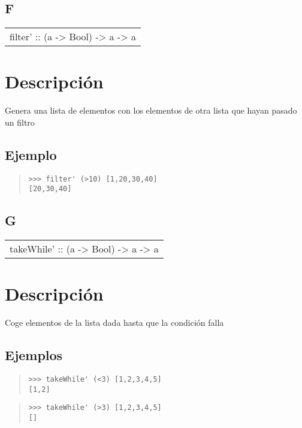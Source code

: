 \subsection{F}
\begin{haddockdesc}
\item[\begin{tabular}{@{}l}
filter' :: (a -> Bool) -> {\char 91}a{\char 93} -> {\char 91}a{\char 93}
\end{tabular}]
{\haddockbegindoc
\section*{Descripción}
Genera una lista de elementos con los elementos de otra lista que hayan pasado un filtro\par
\subsection*{Ejemplo}
\begin{quote}
{\haddockverb\begin{verbatim}
>>> filter' (>10) [1,20,30,40]
[20,30,40]

\end{verbatim}}
\end{quote}}
\end{haddockdesc}
\subsection{G}
\begin{haddockdesc}
\item[\begin{tabular}{@{}l}
takeWhile' :: (a -> Bool) -> {\char 91}a{\char 93} -> {\char 91}a{\char 93}
\end{tabular}]
{\haddockbegindoc
\section*{Descripción}
Coge elementos de la lista dada hasta que la condición falla\par
\subsection*{Ejemplos}
\begin{quote}
{\haddockverb\begin{verbatim}
>>> takeWhile' (<3) [1,2,3,4,5]
[1,2]

\end{verbatim}}
\end{quote}
\begin{quote}
{\haddockverb\begin{verbatim}
>>> takeWhile' (>3) [1,2,3,4,5]
[]

\end{verbatim}}
\end{quote}}
\end{haddockdesc}
